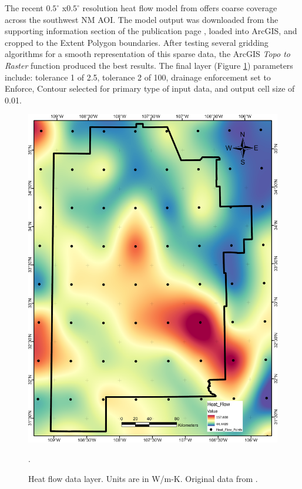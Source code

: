 The recent $0.5^\circ$ x$0.5^\circ$ resolution heat flow model from \citet{lucazeau_analysis_2019} offers coarse coverage across the southwest NM AOI. The model output was downloaded from the supporting information section of the publication page \citep{lucazeau_analysis_2019}, loaded into ArcGIS, and cropped to the Extent Polygon boundaries. After testing several gridding algorithms for a smooth representation of this sparse data, the ArcGIS \textit{Topo to Raster} function produced the best results. The final layer (Figure \ref{fig:feat_heatflow}) parameters include: tolerance 1 of 2.5, tolerance 2 of 100, drainage enforcement set to Enforce, Contour selected for primary type of input data, and output cell size of 0.01. 

\begin{figure}[!htp]
\centering
\includegraphics[scale=.50]{templates/images/Figure-HeatFlow.png}
\caption[Heat flow data layer]{Heat flow data layer. Units are in W/m-K. Original data from \protect\citep{lucazeau_analysis_2019}.}.
\label{fig:feat_heatflow}
\end{figure}

